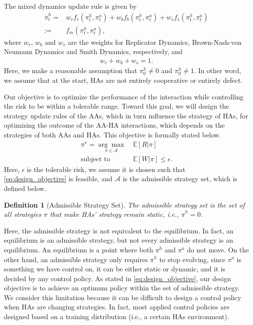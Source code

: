 \documentclass[letterpaper]{article} %
\newcommand{\ie}{\textit{i.e., }}
\newtheorem{definition}{Definition}
\begin{document}
The mixed dynamics update rule is given by
\begin{align}
\label{eq:mixed_update_rule}
    \dot{\pi}^h_t=&w_rf_r(\pi^h_t,\pi^a_t)+w_bf_b(\pi^h_t,\pi^a_t)+w_sf_s(\pi^h_t,\pi^a_t)\nonumber\\
    :=&f_m(\pi^h_t,\pi^a_t),
\end{align}
where $w_r$, $w_b$ and $w_s$ are the weights for Replicator Dynamics, Brown-Nash-von Neumann Dynamics and Smith Dynamics, respectively, and 
\begin{align}
    w_r+w_b+w_s=1.
\end{align}
Here, we make a reasonable assumption that $\pi^h_0\neq 0$ and $\pi^h_0\neq 1$. In other word, we assume that at the start, HAs are not entirely cooperative or entirely defect.



Our objective is to optimize the performance of the interaction while controlling the risk to be within a tolerable range. Toward this goal, we will design the strategy update rules of the AAs, which in turn influence the strategy of HAs, for optimizing the outcome of the AA-HA interactions, which depends on the strategies of both AAs and HAs. This objective is formally stated below. 
\begin{align}
\label{eq:design_objective}
    \pi^\star=\underset{\pi\in\mathcal{A}}{\arg\max}\ &\mathbb{E}[R|\pi]\\
    \textrm{subject to }&\mathbb{E}[W|\pi]\leq \epsilon.\nonumber
\end{align}
Here, $\epsilon$ is the tolerable risk, we assume it is chosen such that \eqref{eq:design_objective} is feasible, and $\mathcal{A}$ is the admissible strategy set, which is defined below.
\begin{definition}[Admissible Strategy Set]
\label{def:admissible_strategy}
The admissible strategy set is the set of all strategies $\pi$ that make HAs' strategy remain static, \ie $\dot{\pi}^h=0$.
\end{definition}
Here, the admissible strategy is not equivalent to the equilibrium. In fact, an equilibrium is an admissible strategy, but not every admissible strategy is an equilibrium. An equilibrium is a point where both $\pi^h$ and $\pi^a$ do not move. On the other hand, an admissible strategy only requires $\pi^h$ to stop evolving, since $\pi^a$ is something we have control on, it can be either static or dynamic, and it is decided by any control policy. As stated in \eqref{eq:design_objective}, our design objective is to achieve an optimum policy within the set of admissible strategy. We consider this limitation because it can be difficult to design a control policy when HAs are changing strategies. In fact, most applied control policies are designed based on a training distribution (i.e., a certain HAs environment).
\end{document}
